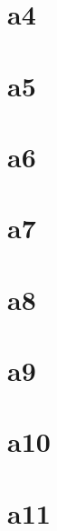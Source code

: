 \section{a4}
\section{a5}
\section{a6}
\section{a7}
\section{a8}
\section{a9}
\section{a10}
\section{a11}
